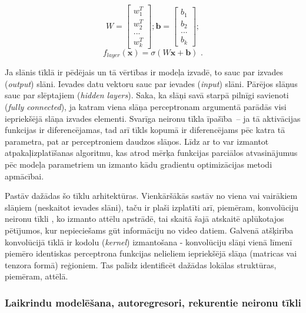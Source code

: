 \documentclass[12pt, a4paper]{article}
\numberwithin{equation}{section} %
\begin{document}
\begin{equation} 
    W = \begin{bmatrix}
        w_1^T \\
        w_2^T \\
        ... \\
        w_k^T
    \end{bmatrix}; 
     \boldsymbol{b} =  \begin{bmatrix}
        b_1 \\
        b_2 \\
        ... \\
        b_k
    \end{bmatrix}; 
\end{equation}
\begin{equation} 
    f_{layer}( \boldsymbol{x}) = \sigma(W \boldsymbol{x}+ \boldsymbol{b})
\text{ .}
\end{equation}

Ja slānis tīklā ir pēdējais un tā vērtības ir modeļa izvadē, to sauc par izvades (\textit{output}) slāni. Ievades datu vektoru sauc par ievades (\textit{input}) slāni. Pārējos slāņus sauc par slēptajiem (\textit{hidden layers}). Saka, ka slāņi savā starpā pilnīgi savienoti (\textit{fully connected}), ja katram viena slāņa perceptronam argumentā parādās visi iepriekšējā slāņa izvades elementi. Svarīga neironu tīkla īpašība~-- ja tā aktivācijas funkcijas ir diferencējamas, tad arī tīkls kopumā ir diferencējams pēc katra tā parametra, pat ar perceptroniem daudzos slāņos. Līdz ar to var izmantot atpakaļizplatīšanas algoritmu, kas atrod mērķa funkcijas parciālos atvasinājumus pēc modeļa parametriem un izmanto kādu gradientu optimizācijas metodi apmācībai.

Pastāv dažādas šo tīklu arhitektūras. Vienkāršākās sastāv no viena vai vairākiem slāņiem (neskaitot ievades slāni), taču ir plaši izplatīti arī, piemēram, konvolūciju neironu tīkli \cite{krizhevsky2012imagenet}, ko izmanto attēlu apstrādē, tai skaitā šajā atskaitē aplūkotajos pētījumos, kur nepieciešams gūt informāciju no video datiem. Galvenā atšķirība konvolūcijā tīklā ir kodolu (\textit{kernel}) izmantošana - konvolūciju slāņi vienā līmenī piemēro identiskas perceptrona funkcijas nelieliem iepriekšējā slāņa (matricas vai tenzora formā) reģioniem. Tas palīdz identificēt dažādas lokālas struktūras, piemēram, attēlā. 

\subsubsection{Laikrindu modelēšana, autoregresori, rekurentie neironu tīkli}
\end{document}
